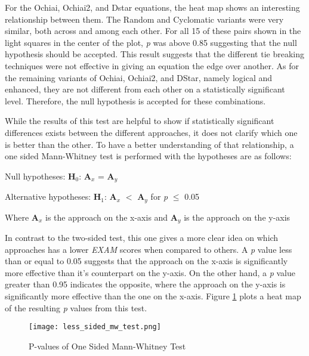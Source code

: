 For the Ochiai, Ochiai2, and Dstar equations, the heat map shows an interesting
relationship between them. The Random and Cyclomatic variants were very similar,
both across and among each other. For all 15 of these pairs shown in the light
squares in the center of the plot,
\emph{p} was above 0.85 suggesting that the null hypothesis should be accepted.
This result suggests that the different tie breaking techniques were not
effective in giving an equation the edge over another.
As for the remaining variants of Ochiai, Ochiai2, and DStar, namely logical and
enhanced, they are not different from each other on a statistically significant
level. Therefore, the null hypothesis is accepted for these combinations.

While the results of this test are helpful to show if statistically significant
differences exists between the different approaches, it does not clarify which
one is better than the other. To have a better understanding of that
relationship, a one sided  Mann-Whitney test is performed with the
hypotheses are as follows:

\begin{center}
    Null hypotheses: \textbf{H$_{0}$}: \textbf{A$_{x}$} = \textbf{A$_{y}$}

    Alternative hypotheses: \textbf{H$_{1}$}: \textbf{A$_{x}$} $<$
    \textbf{A$_{y}$}
    for \emph{p} $\leq$  0.05

    Where \textbf{A$_{x}$} is the approach on the x-axis and \textbf{A$_{y}$} is
    the approach on the y-axis
\end{center}

In contrast to the two-sided test, this one gives a more clear idea on which
approaches has a lower \emph{EXAM} scores when compared to others. A \emph{p}
value less than or equal to 0.05 suggests that the approach on the x-axis is
significantly more effective than it's counterpart on the y-axis. On the other
hand, a \emph{p} value greater than 0.95 indicates the opposite, where the
approach on the y-axis is significantly more effective than the one on the x-axis. Figure
\ref{fig:one_sided_mw_test} plots a heat map of the resulting \emph{p} values
from this test.

\begin{figure}[!htb]
	\begin{center}
		\texttt{[image: less\_sided\_mw\_test.png]}
        \caption{\label{fig:one_sided_mw_test} P-values of One Sided Mann-Whitney Test}
	\end{center}
\end{figure}

